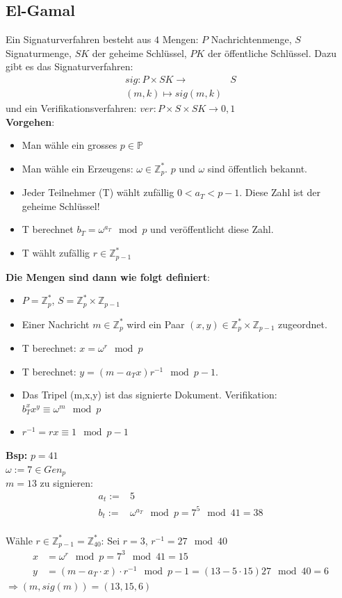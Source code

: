 \documentclass[landscape,twocolumn,a4paper]{article}
\newcommand{\ZN}{\mathbb{Z}} %
\newcommand{\Bold}[1]{\textbf{#1}} %
\newcommand{\Ra}{\Rightarrow}
\begin{document}
\subsection{El-Gamal}
Ein Signaturverfahren besteht aus $4$ Mengen: $P$ Nachrichtenmenge, $S$ Signaturmenge, $SK$ der geheime Schlüssel, $PK$ der öffentliche Schlüssel. Dazu gibt es das Signaturverfahren:
\begin{align*}
sig: P \times SK \rightarrow& S \\
(m,k) \mapsto sig(m, k)
\end{align*}
und ein Verifikationsverfahren: $ver: P \times S \times SK \rightarrow {0,1}$\\
\textbf{Vorgehen}:
\begin{itemize}
	\item Man wähle ein grosses $p \in \mathbb{P}$
	\item Man wähle ein Erzeugens: $\omega \in \mathbb{Z}_p^*$. $p$ und $\omega$ sind öffentlich bekannt.
	\item Jeder Teilnehmer (T) wählt zufällig $0 < a_T < p-1$. Diese Zahl ist der geheime Schlüssel!
	\item T berechnet $b_T = \omega^{a_T} \mod p$ und veröffentlicht diese Zahl.
	\item T wählt zufällig $r \in \mathbb{Z}_{p-1}^*$
\end{itemize}
\textbf{Die Mengen sind dann wie folgt definiert}:
\begin{itemize}
	\item $P = \mathbb{Z}_p^*$, $S = \mathbb{Z}_p^* \times \mathbb{Z}_{p-1}$ 
	\item Einer Nachricht $m \in \mathbb{Z}_p^*$ wird ein Paar $(x, y) \in \mathbb{Z}_p^* \times \mathbb{Z}_{p-1}$ zugeordnet. 
	\item T berechnet: $x = \omega ^r \mod p$ 
	\item T berechnet: $y = (m-a_T x)r^{-1} \mod p-1$. 
	\item Das Tripel (m,x,y) ist das signierte Dokument. Verifikation: $b_T^x x^y \equiv \omega ^m \mod p$
	\item $r^{-1} = rx \equiv 1 \mod p-1$
\end{itemize}
  \Bold{Bsp:} $p=41$\\
  $\omega:=7\in Gen_p$\\
  $m=13$ zu signieren:
  \begin{align*}
   a_t:=&5\\
   b_t:=&\omega^{a_T}\mod p=7^5\mod 41=38
  \end{align*}\\
  Wähle $r\in\ZN_{p-1}^*=\ZN_{40}^*$: Sei $r=3$, $r^{-1}=27\mod40$\\
  \begin{align*}
   x&=\omega^r\mod p=7^3\mod41=15\\
   y&=(m-a_T\cdot x)\cdot r^{-1}\mod p-1=(13-5\cdot 15)27\mod40=6
  \end{align*}
  $\Ra(m,sig(m))=(13,15,6)$
\end{document}
